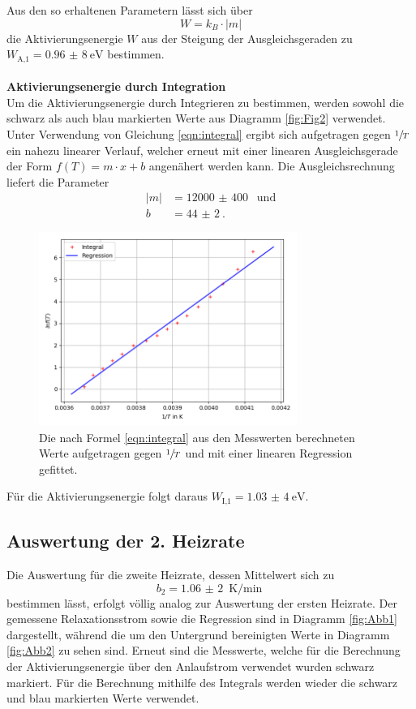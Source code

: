 Aus den so erhaltenen Parametern lässt sich über
\begin{equation}
  W=k_{B}\cdot |m|
  \label{eqn:Aktivierung}
\end{equation}
die Aktivierungsenergie $W$ aus der Steigung der Ausgleichsgeraden zu $W_\text{A,1}=\SI{0,96(8)}{\eV}$ bestimmen.
\\
\\
\textbf{Aktivierungsenergie durch Integration}\\
Um die Aktivierungsenergie durch Integrieren zu bestimmen, werden sowohl die schwarz als auch blau markierten
Werte aus Diagramm \ref{fig:Fig2} verwendet. Unter Verwendung von Gleichung \ref{eqn:integral} ergibt sich aufgetragen
gegen $\sfrac{1}{T}$ ein nahezu linearer Verlauf, welcher erneut mit einer linearen Ausgleichsgerade der
Form $f(T)=m\cdot x+b$ angenähert werden kann. Die Ausgleichsrechnung liefert die Parameter
\begin{align}
  |m|&=\SI{12000(400)}{}\;\; \text{und}\\
  b&=\SI{44(2)}{}.
\end{align}

\begin{figure}[H]
  \centering
  \includegraphics[width=0.75\textwidth]{Dipol1Integral.png}
  \caption{Die nach Formel \ref{eqn:integral} aus den Messwerten berechneten Werte aufgetragen
  gegen $\sfrac{1}{T}$ und mit einer linearen Regression gefittet.}
  \label{fig:Fig4}
\end{figure}

Für die Aktivierungsenergie folgt daraus $W_\text{I,1}=\SI{1,03(4)}{\eV}$.

\subsection{Auswertung der 2. Heizrate}
Die Auswertung für die zweite Heizrate, dessen Mittelwert sich zu
\begin{equation}
  b_2=\SI{1,06(2)}{\K\per\min}
\end{equation}
bestimmen lässt, erfolgt völlig analog zur Auswertung der ersten Heizrate.
Der gemessene Relaxationsstrom sowie die Regression sind in Diagramm \ref{fig:Abb1} dargestellt, während
die um den Untergrund bereinigten Werte in Diagramm \ref{fig:Abb2} zu sehen sind. Erneut sind die Messwerte, welche für
die Berechnung der Aktivierungsenergie über den Anlaufstrom verwendet wurden schwarz markiert. Für die Berechnung
mithilfe des Integrals werden wieder die schwarz und blau markierten Werte verwendet.

